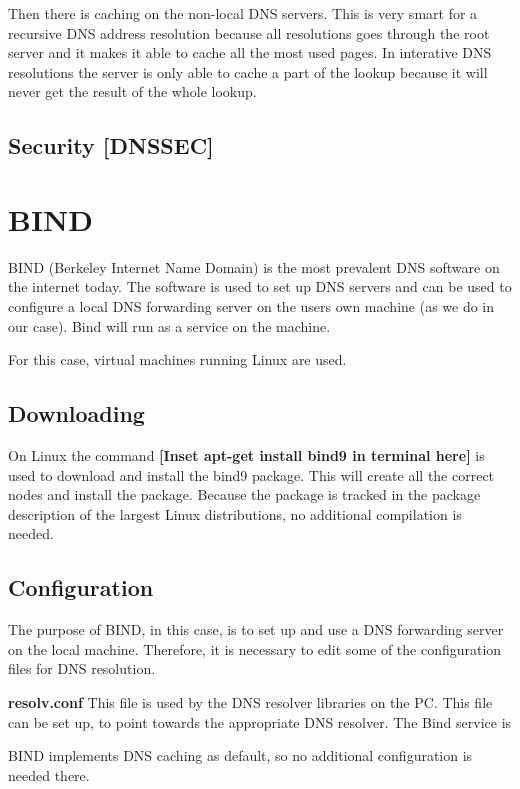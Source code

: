 Then there is caching on the non-local DNS servers. This is very smart for a recursive DNS address resolution because all resolutions goes through the root server and it makes it able to cache all the most used pages. In interative DNS resolutions the server is only able to cache a part of the lookup because it will never get the result of the whole lookup.

\subsection{Security [DNSSEC]}

\section{BIND}
BIND (Berkeley Internet Name Domain) is the most prevalent DNS software on the internet today. The software is used to set up DNS servers and can be used to configure a local DNS forwarding server on the users own machine (as we do in our case).
Bind will run as a service on the machine. 

For this case, virtual machines running Linux are used. 
\subsection{Downloading}
On Linux the command
\textbf{[Inset apt-get install bind9 in terminal here]}
is used to download and install the bind9 package. This will create all the correct nodes and install the package. 
Because the package is tracked in the package description of the largest Linux distributions, no additional compilation is needed.

\subsection{Configuration}
The purpose of BIND, in this case, is to set up and use a DNS forwarding server on the local machine. 
Therefore, it is necessary to edit some of the configuration files for DNS resolution.

\textbf{resolv.conf}
This file is used by the DNS resolver libraries on the PC. This file can be set up, to point towards the appropriate DNS resolver. The Bind service is 

BIND implements DNS caching as default, so no additional configuration is needed there. 

